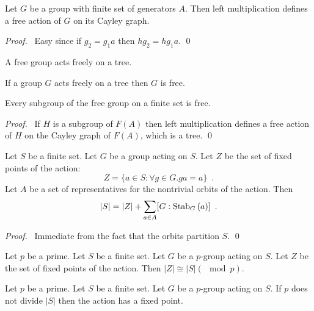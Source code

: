 \begin{prop}
Let $G$ be a group with finite set of generators $A$. Then left multiplication defines a free action of $G$ on its Cayley graph.
\end{prop}

\begin{proof}
\pf\ Easy since if $g_2 = g_1 a$ then $h g_2 = h g_1 a$. \qed
\end{proof}

\begin{cor}
A free group acts freely on a tree.
\end{cor}

\begin{thm}
If a group $G$ acts freely on a tree then $G$ is free.
\end{thm}


\begin{cor}
Every subgroup of the free group on a finite set is free.
\end{cor}

\begin{proof}
\pf\ If $H$ is a subgroup of $F(A)$ then left multiplication defines a free action of $H$ on the Cayley graph of $F(A)$, which is a tree. \qed
\end{proof}

\begin{prop}
\label{prop:class-formula}
Let $S$ be a finite set. Let $G$ be a group acting on $S$. Let $Z$ be the set of fixed points of the action:
\[ Z = \{a \in S : \forall g \in G. ga = a \} \enspace . \]
Let $A$ be a set of representatives for the nontrivial orbits of the action. Then
\[ |S| = |Z| + \sum_{a \in A} [G : \mathrm{Stab}_{G} \left( {a} \right)] \enspace . \]
\end{prop}

\begin{proof}
\pf\ Immediate from the fact that the orbits partition $S$. \qed
\end{proof}

\begin{cor}
\label{cor:fixed-points-of-action-of-p-group}
Let $p$ be a prime.
Let $S$ be a finite set. Let $G$ be a $p$-group acting on $S$. Let $Z$ be the set of fixed points of the action. Then $|Z| \cong |S| (\mod p)$.
\end{cor}

\begin{cor}
\label{cor:p-not-divide-fixed-point}
Let $p$ be a prime. Let $S$ be a finite set. Let $G$ be a $p$-group acting on $S$. If $p$ does not divide $|S|$ then the action has a fixed point.
\end{cor}

